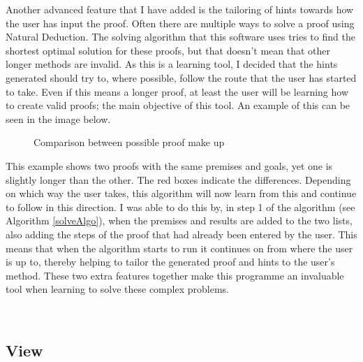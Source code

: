 Another advanced feature that I have added is the tailoring of hints towards how the user has input the proof. Often there are multiple ways to solve a proof using Natural Deduction. The solving algorithm that this software uses tries to find the shortest optimal solution for these proofs, but that doesn't mean that other longer methods are invalid. As this is a learning tool, I decided that the hints generated should try to, where possible, follow the route that the user has started to take. Even if this means a longer proof, at least the user will be learning how to create valid proofs; the main objective of this tool. An example of this can be seen in the image below.

\begin{figure}[!ht]
	\centering
	\caption{Comparison between possible proof make up}
\end{figure}

This example shows two proofs with the same premises and goals, yet one is slightly longer than the other. The red boxes indicate the differences. Depending on which way the user takes, this algorithm will now learn from this and continue to follow in this direction. I was able to do this by, in step 1 of the algorithm (see Algorithm \ref{solveAlgo}), when the premises and results are added to the two lists, also adding the steps of the proof that had already been entered by the user. This means that when the algorithm starts to run it continues on from where the user is up to, thereby helping to tailor the generated proof and hints to the user's method. These two extra features together make this programme an invaluable tool when learning to solve these complex problems. 

\pagebreak\
\subsection{View}


